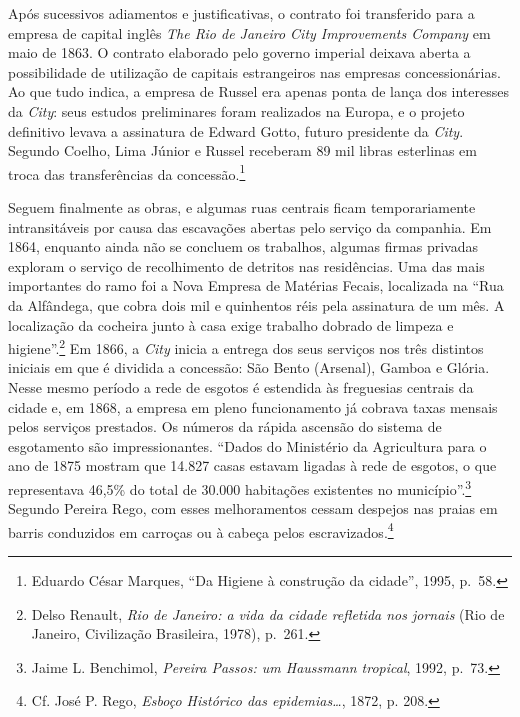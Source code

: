 Após sucessivos adiamentos e justificativas, o contrato foi transferido
para a empresa de capital inglês \emph{The Rio de Janeiro City
Improvements Company} em maio de 1863. O contrato elaborado pelo governo
imperial deixava aberta a possibilidade de utilização de capitais
estrangeiros nas empresas concessionárias. Ao que tudo indica, a empresa
de Russel era apenas ponta de lança dos interesses da \emph{City}: seus
estudos preliminares foram realizados na Europa, e o projeto definitivo
levava a assinatura de Edward Gotto, futuro presidente da \emph{City}.
Segundo Coelho, Lima Júnior e Russel receberam 89 mil libras esterlinas
em troca das transferências da concessão.\footnote{Eduardo César
  Marques, ``Da Higiene à construção da cidade'', 1995, p.~58.}

Seguem finalmente as obras, e algumas ruas centrais ficam
temporariamente intransitáveis por causa das escavações abertas pelo
serviço da companhia. Em 1864, enquanto ainda não se concluem os
trabalhos, algumas firmas privadas exploram o serviço de recolhimento de
detritos nas residências. Uma das mais importantes do ramo foi a Nova
Empresa de Matérias Fecais, localizada na ``Rua da Alfândega, que cobra
dois mil e quinhentos réis pela assinatura de um mês. A localização da
cocheira junto à casa exige trabalho dobrado de limpeza e
higiene''.\footnote{Delso Renault, \emph{Rio de Janeiro: a vida da
  cidade refletida nos jornais} (Rio de Janeiro, Civilização Brasileira,
  1978), p.~261.} Em 1866, a \emph{City} inicia a entrega dos seus
serviços nos três distintos iniciais em que é dividida a concessão: São
Bento (Arsenal), Gamboa e Glória. Nesse mesmo período a rede de esgotos
é estendida às freguesias centrais da cidade e, em 1868, a empresa em
pleno funcionamento já cobrava taxas mensais pelos serviços prestados.
Os números da rápida ascensão do sistema de esgotamento são
impressionantes. ``Dados do Ministério da Agricultura para o ano de 1875
mostram que 14.827 casas estavam ligadas à rede de esgotos, o que
representava 46,5\% do total de 30.000 habitações existentes no
município''.\footnote{Jaime L. Benchimol, \emph{Pereira Passos: um
  Haussmann tropical}, 1992, p.~73.} Segundo Pereira Rego, com esses
melhoramentos cessam despejos nas praias em barris conduzidos em
carroças ou à cabeça pelos escravizados.\footnote{Cf. José P. Rego,
  \emph{Esboço Histórico das epidemias\ldots{}}, 1872, p. 208.}

